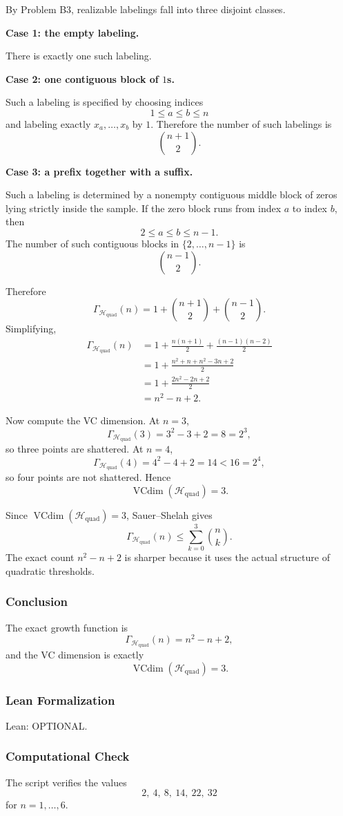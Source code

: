 \documentclass{article}
\newcommand{\vcdim}{\operatorname{VCdim}}
\newcommand{\growth}{\Gamma}
\newcommand{\classB}{\mathcal{H}_{\mathrm{quad}}}
\begin{document}
\begin{solutionbox}
By Problem B3, realizable labelings fall into three disjoint classes.

\textbf{Case 1: the empty labeling.}

There is exactly one such labeling.

\textbf{Case 2: one contiguous block of \(1\)s.}

Such a labeling is specified by choosing indices
\[
1\le a\le b\le n
\]
and labeling exactly \(x_a,\dots,x_b\) by \(1\). Therefore the number of such
labelings is
\[
\binom{n+1}{2}.
\]

\textbf{Case 3: a prefix together with a suffix.}

Such a labeling is determined by a nonempty contiguous middle block of zeros
lying strictly inside the sample. If the zero block runs from index \(a\) to
index \(b\), then
\[
2\le a\le b\le n-1.
\]
The number of such contiguous blocks in \(\{2,\dots,n-1\}\) is
\[
\binom{n-1}{2}.
\]

Therefore
\[
\growth_{\classB}(n)
=
1+\binom{n+1}{2}+\binom{n-1}{2}.
\]
Simplifying,
\begin{align*}
\growth_{\classB}(n)
&=
1+\frac{n(n+1)}{2}+\frac{(n-1)(n-2)}{2}\\
&=
1+\frac{n^2+n+n^2-3n+2}{2}\\
&=
1+\frac{2n^2-2n+2}{2}\\
&=
n^2-n+2.
\end{align*}

Now compute the VC dimension. At \(n=3\),
\[
\growth_{\classB}(3)=3^2-3+2=8=2^3,
\]
so three points are shattered. At \(n=4\),
\[
\growth_{\classB}(4)=4^2-4+2=14<16=2^4,
\]
so four points are not shattered. Hence
\[
\vcdim(\classB)=3.
\]

Since \(\vcdim(\classB)=3\), Sauer--Shelah gives
\[
\growth_{\classB}(n)\le \sum_{k=0}^{3}\binom{n}{k}.
\]
The exact count \(n^2-n+2\) is sharper because it uses the actual structure of
quadratic thresholds.

\subsubsection{Conclusion}

The exact growth function is
\[
\growth_{\classB}(n)=n^2-n+2,
\]
and the VC dimension is exactly
\[
\vcdim(\classB)=3.
\]

\subsubsection{Lean Formalization}

Lean: OPTIONAL.

\subsubsection{Computational Check}

The script verifies the values
\[
2,\ 4,\ 8,\ 14,\ 22,\ 32
\]
for \(n=1,\dots,6\).

\end{solutionbox}
\end{document}
